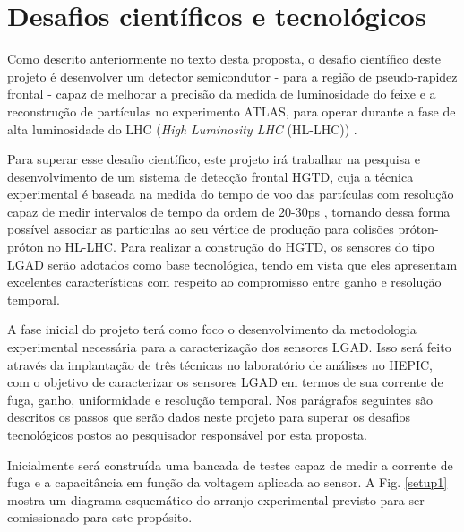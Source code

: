 \chapter{Desafios científicos e tecnológicos}

Como descrito anteriormente no texto desta proposta, o desafio científico deste projeto é desenvolver um detector semicondutor - para a região de pseudo-rapidez frontal - capaz de melhorar a precisão da medida de luminosidade do feixe e a reconstrução de partículas no experimento ATLAS, para operar durante a fase de alta luminosidade do LHC ({\it High Luminosity LHC} (HL-LHC)) \cite{tdr}. 

Para superar esse desafio científico, este projeto irá trabalhar na pesquisa e desenvolvimento de um sistema de detecção frontal HGTD, cuja a técnica experimental é baseada na medida do tempo de voo das partículas com resolução capaz de medir intervalos de tempo da ordem de 20-30ps \cite{tdr}, tornando dessa forma possível associar as partículas ao seu vértice de produção para colisões próton-próton no HL-LHC. Para realizar a construção do HGTD, os sensores do tipo LGAD serão adotados como base tecnológica, tendo em vista que eles apresentam excelentes características com respeito ao compromisso entre ganho e resolução temporal. 

A fase inicial do projeto terá como foco o desenvolvimento da metodologia experimental necessária para a caracterização dos sensores LGAD. Isso será feito através da implantação de três técnicas no laboratório de análises no HEPIC, com o objetivo de caracterizar os sensores LGAD em termos de sua corrente de fuga, ganho, uniformidade e resolução temporal. Nos parágrafos seguintes são descritos os passos que serão dados neste projeto para superar os desafios tecnológicos postos ao pesquisador responsável por esta proposta. 

Inicialmente será construída uma bancada de testes capaz de medir a corrente de fuga e a capacitância em função da voltagem aplicada ao sensor. A Fig. \ref{setup1} mostra um diagrama esquemático do arranjo experimental previsto para ser comissionado para este propósito.

